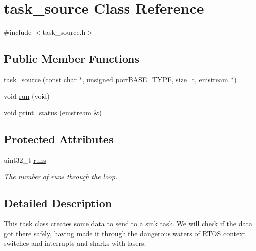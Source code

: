 \hypertarget{classtask__source}{\section{task\-\_\-source \-Class \-Reference}
\label{classtask__source}
}


{\ttfamily \#include $<$task\-\_\-source.\-h$>$}

\subsection*{\-Public \-Member \-Functions}
\begin{DoxyCompactItemize}
\item 
\hyperlink{classtask__source_aae32ac2cf2c64de37e329b660be59c34}{task\-\_\-source} (const char $\ast$, unsigned port\-B\-A\-S\-E\-\_\-\-T\-Y\-P\-E, size\-\_\-t, emstream $\ast$)
\item 
void \hyperlink{classtask__source_a927a4597966476a7616d4d4120b9c43d}{run} (void)
\item 
void \hyperlink{classtask__source_aa44d5bc1d49ea4532b57afbc9d53ad25}{print\-\_\-status} (emstream \&)
\end{DoxyCompactItemize}
\subsection*{\-Protected \-Attributes}
\begin{DoxyCompactItemize}
\item 
\hypertarget{classtask__source_adb2e2007c9dc498470637c4fc5444340}{uint32\-\_\-t \hyperlink{classtask__source_adb2e2007c9dc498470637c4fc5444340}{runs}}\label{classtask__source_adb2e2007c9dc498470637c4fc5444340}

\begin{DoxyCompactList}\small\item\em \-The number of runs through the loop. \end{DoxyCompactList}\end{DoxyCompactItemize}


\subsection{\-Detailed \-Description}
\-This task class creates some data to send to a sink task. \-We will check if the data got there safely, having made it through the dangerous waters of \-R\-T\-O\-S context switches and interrupts and sharks with lasers. 

